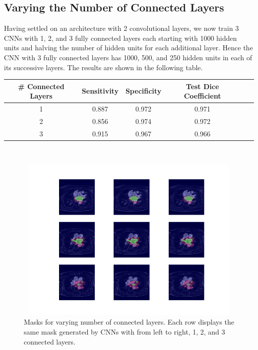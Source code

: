 \subsection{Varying the Number of Connected Layers}

\noindent Having settled on an architecture with 2 convolutional layers, we now train 3 CNNs with 1, 2, and 3 fully connected layers each starting with 1000 hidden units and halving the number of hidden units for each additional layer. Hence the CNN with 3 fully connected layers has 1000, 500, and 250 hidden units in each of its successive layers. The results are shown in the following table.\\

{
\centering
\begin{tabular}{cccccc}
\rowcolor[HTML]{C0C0C0} 
             \# Connected Layers & Sensitivity & Specificity & Test Dice Coefficient \\ \hline
1  & 0.887       & 0.972       & 0.971                                                        \\ 
2  & 0.856       & 0.974       & 0.972                                                        \\ 
3  & 0.915       & 0.967       & 0.966                                                       
\end{tabular}\\
\vspace{0.5cm}
}

\begin{figure}
\centering
\includegraphics[trim=2.5cm 1.5cm 2cm 1.5cm, clip=true, height=80mm, width=150mm]{Chapter3/mask_results_varying_number_of_connected_layers.png}
\caption{Masks for varying number of connected layers. Each row displays the same mask generated by CNNs with from left to right, 1, 2, and 3 connected layers.}
\label{mask_varying_connected_layers}
\end{figure}

